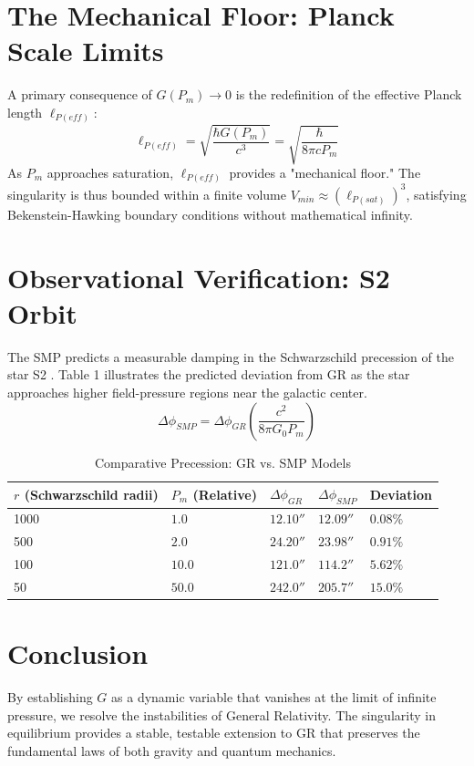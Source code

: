 \documentclass[11pt,letterpaper]{article}
\begin{document}
\section{The Mechanical Floor: Planck Scale Limits}
A primary consequence of $G(P_m) \to 0$ is the redefinition of the effective Planck length $\ell_{P(eff)}$:
\begin{equation}
\ell_{P(eff)} = \sqrt{\frac{\hbar G(P_m)}{c^3}} = \sqrt{\frac{\hbar}{8\pi c P_m}}
\end{equation}
As $P_m$ approaches saturation, $\ell_{P(eff)}$ provides a "mechanical floor." The singularity is thus bounded within a finite volume $V_{min} \approx (\ell_{P(sat)})^3$, satisfying Bekenstein-Hawking boundary conditions without mathematical infinity.

\section{Observational Verification: S2 Orbit}
The SMP predicts a measurable damping in the Schwarzschild precession of the star S2 \cite{GRAVITY2020}. Table 1 illustrates the predicted deviation from GR as the star approaches higher field-pressure regions near the galactic center.
\begin{equation}
\Delta \phi_{SMP} = \Delta \phi_{GR} \left( \frac{c^2}{8\pi G_0 P_m} \right)
\end{equation}

\begin{table}[h]
\centering
\caption{Comparative Precession: GR vs. SMP Models}
\begin{tabular}{lllll}
\toprule
$r$ (Schwarzschild radii) & $P_m$ (Relative) & $\Delta \phi_{GR}$ & $\Delta \phi_{SMP}$ & Deviation \\ \midrule
1000 & $1.0$ & $12.10''$ & $12.09''$ & $0.08\%$ \\
500 & $2.0$ & $24.20''$ & $23.98''$ & $0.91\%$ \\
100 & $10.0$ & $121.0''$ & $114.2''$ & $5.62\%$ \\
50 & $50.0$ & $242.0''$ & $205.7''$ & $15.0\%$ \\ \bottomrule
\end{tabular}
\end{table}

\section{Conclusion}
By establishing $G$ as a dynamic variable that vanishes at the limit of infinite pressure, we resolve the instabilities of General Relativity. The singularity in equilibrium provides a stable, testable extension to GR that preserves the fundamental laws of both gravity and quantum mechanics.
\end{document}
